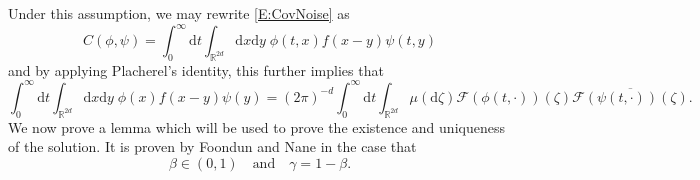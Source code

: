 \documentclass[a4paper,11pt]{article}
\numberwithin{equation}{section}
\theoremstyle{plain}
\theoremstyle{definition}
\newcommand{\ud}{\ensuremath{\mathrm{d} }}
\newcommand{\R}{\mathbb{R}}
\numberwithin{NQ}{section}
\numberwithin{LQ}{section}
\numberwithin{ZQ}{section}
\begin{document}
\noindent Under this assumption, we may rewrite \eqref{E:CovNoise} as 
	\[
		C(\phi,\psi) = \int_0^\infty \ud t \int_{\R^{2d}} \ud x \ud y \; \phi(t,x) f(x-y) \psi(t,y)
	\]
  and by applying Placherel's identity, this further implies that 
  	\[
  		\int_0^\infty \ud t \int_{\R^{2d}} \ud x \ud y \; \phi(x) f(x-y) \psi(y) = (2 \pi)^{-d} \int_0^\infty \ud t \int_{\R^{2d}} \mu(\ud \zeta) \mathcal{F}(\phi(t,\cdot))(\zeta) \overline{\mathcal{F}(\psi(t,\cdot))(\zeta)}.
  	\]
We now prove a lemma which will be used to prove the existence and uniqueness of the solution. It is proven by Foondun and Nane \cite{FN2016} in the case that 		
\begin{equation}
\label{A:Y=GAssumptions}
\beta \in (0,1) \quad \text{and} \quad \gamma = 1 - \beta.
\end{equation}		
\end{document}
